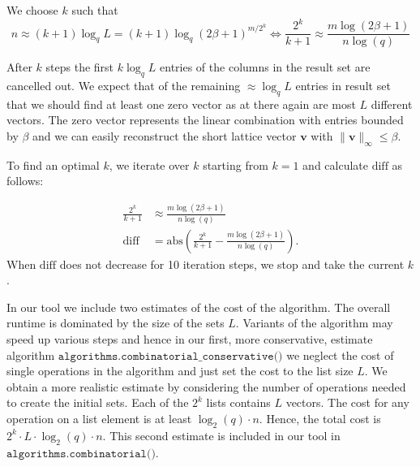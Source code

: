 We choose $k$ such that
\begin{equation}
  n \approx (k+1) \log_q L = (k+1) \log_q (2\beta+1)^{m/2^k} \iff \frac{2^k}{k+1} \approx \frac{m \log(2\beta + 1)}{n \log(q)}
\end{equation}

After $k$ steps the first $k \log_q L$ entries of the columns in the result set are cancelled out. We expect that of the remaining $\approx \log_q L$ entries in result set that we should find at least one zero vector as at there again are most $L$ different vectors. The zero vector represents the linear combination with entries bounded by $\beta$ and we can easily reconstruct the short lattice vector $\mathbf{v}$ with $\|\mathbf{v}\|_\infty \leq \beta$.

To find an optimal $k$, we iterate over $k$ starting from $k=1$ and calculate $\text{diff}$ as follows:

\begin{align}
  \frac{2^k}{k+1} & \approx \frac{m \log(2\beta + 1)}{n \log(q)}                                     \\
  \text{diff}     & = \text{abs}\left(\frac{2^k}{k+1} - \frac{m \log(2\beta + 1)}{n \log(q)}\right).
\end{align}
When $\text{diff}$ does not decrease for 10 iteration steps, we stop and take the current $k$. %

In our tool we include two estimates of the cost of the algorithm. The overall runtime is dominated by the size of the sets $L$. Variants of the algorithm may speed up various steps and hence in our first, more conservative, estimate algorithm $\texttt{algorithms.combinatorial\_conservative()}$ we neglect the cost of single operations in the algorithm and just set the cost to the list size $L$. We obtain a more realistic estimate by considering the number of operations needed to create the initial sets. Each of the $2^k$ lists contains $L$ vectors. The cost for any operation on a list element is at least $\log_2(q) \cdot n$. Hence, the total cost is $2^k \cdot L \cdot \log_2(q) \cdot n$. This second estimate is included in our tool in $\texttt{algorithms.combinatorial()}$.


